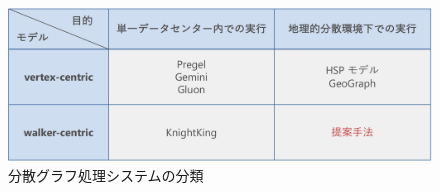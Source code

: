 \begin{figure}[t]
    \centering
    \includegraphics[scale=0.5]{figure/DistributedSystem.pdf}
    \caption{分散グラフ処理システムの分類}
    \label{分散グラフ処理システムの分類}
\end{figure}